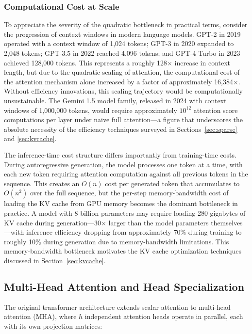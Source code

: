 \documentclass[11pt,letterpaper]{article}
\begin{document}
\subsubsection{Computational Cost at Scale}

To appreciate the severity of the quadratic bottleneck in practical terms, consider the progression of context windows in modern language models. GPT-2 in 2019 operated with a context window of 1,024 tokens; GPT-3 in 2020 expanded to 2,048 tokens; GPT-3.5 in 2022 reached 4,096 tokens; and GPT-4 Turbo in 2023 achieved 128,000 tokens. This represents a roughly 128$\times$ increase in context length, but due to the quadratic scaling of attention, the computational cost of the attention mechanism alone increased by a factor of approximately 16,384$\times$. Without efficiency innovations, this scaling trajectory would be computationally unsustainable. The Gemini 1.5 model family, released in 2024 with context windows of 1,000,000 tokens, would require approximately $10^{12}$ attention score computations per layer under naive full attention---a figure that underscores the absolute necessity of the efficiency techniques surveyed in Sections~\ref{sec:sparse} and \ref{sec:kvcache}.

The inference-time cost structure differs importantly from training-time costs. During autoregressive generation, the model processes one token at a time, with each new token requiring attention computation against all previous tokens in the sequence. This creates an $O(n)$ cost per generated token that accumulates to $O(n^2)$ over the full sequence, but the per-step memory-bandwidth cost of loading the KV cache from GPU memory becomes the dominant bottleneck in practice. A model with 8 billion parameters may require loading 280 gigabytes of KV cache during generation---30$\times$ larger than the model parameters themselves---with inference efficiency dropping from approximately 70\% during training to roughly 10\% during generation due to memory-bandwidth limitations. This memory-bandwidth bottleneck motivates the KV cache optimization techniques discussed in Section~\ref{sec:kvcache}.

\subsection{Multi-Head Attention and Head Specialization}

The original transformer architecture extends scalar attention to multi-head attention (MHA), where $h$ independent attention heads operate in parallel, each with its own projection matrices:
\end{document}
